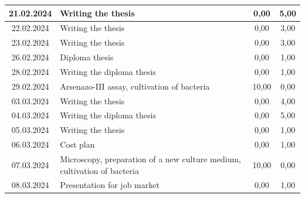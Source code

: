 \begin{longtable}{|c|p{7cm}|c|c|}
    21.02.2024    & Writing the thesis                                                                                              & 0,00                 & 5,00              \\ \hline
    22.02.2024    & Writing the thesis                                                                                              & 0,00                 & 3,00              \\ \hline
    23.02.2024    & Writing the thesis                                                                                              & 0,00                 & 3,00              \\ \hline
    26.02.2024    & Diploma thesis                                                                                                  & 0,00                 & 1,00              \\ \hline
    28.02.2024    & Writing the diploma thesis                                                                                      & 0,00                 & 1,00              \\ \hline
    29.02.2024    & Arsenazo-III assay, cultivation of bacteria                                                                     & 10,00                & 0,00              \\ \hline
    03.03.2024    & Writing the thesis                                                                                              & 0,00                 & 4,00              \\ \hline
    04.03.2024    & Writing the diploma thesis                                                                                      & 0,00                 & 5,00              \\ \hline
    05.03.2024    & Writing the thesis                                                                                              & 0,00                 & 1,00              \\ \hline
    06.03.2024    & Cost plan                                                                                                       & 0,00                 & 1,00              \\ \hline
    07.03.2024    & Microscopy, preparation of a new culture medium, cultivation of bacteria & 10,00 & 0,00 \\ \hline
    08.03.2024    & Presentation for job market                                                                                     & 0,00                 & 1,00              \\ \hline

\end{longtable}
